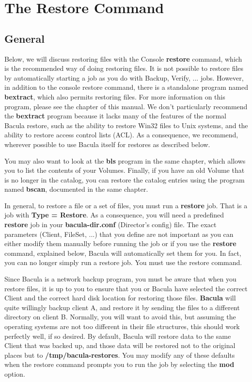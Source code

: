 \chapter{The Restore Command}
\label{RestoreChapter}

\section{General}

Below, we will discuss restoring files with the Console {\bf restore} command,
which is the recommended way of doing restoring files. It is not possible
to restore files by automatically starting a job as you do with Backup,
Verify, ... jobs.  However, in addition to the console restore command,
there is a standalone program named {\bf bextract}, which also permits
restoring files.  For more information on this program, please see the
 chapter of this manual. We 
don't particularly recommend the {\bf bextract} program because it
lacks many of the features of the normal Bacula restore, such as the 
ability to restore Win32 files to Unix systems, and the ability to
restore access control lists (ACL).  As a consequence, we recommend,
wherever possible to use Bacula itself for restores as described below.

You may also want to look at the {\bf bls} program in the same chapter,
which allows you to list the contents of your Volumes.  Finally, if you
have an old Volume that is no longer in the catalog, you can restore the
catalog entries using the program named {\bf bscan}, documented in the same
 chapter.

In general, to restore a file or a set of files, you must run a {\bf restore}
job. That is a job with {\bf Type = Restore}. As a consequence, you will need
a predefined {\bf restore} job in your {\bf bacula-dir.conf} (Director's
config) file. The exact parameters (Client, FileSet, ...) that you define are
not important as you can either modify them manually before running the job or
if you use the {\bf restore} command, explained below, Bacula will  
automatically set them for you. In fact, you can no longer simply run a restore
job.  You must use the restore command.                                  

Since Bacula is a network backup program, you must be aware that when you
restore files, it is up to you to ensure that you or Bacula have selected the
correct Client and the correct hard disk location for restoring those files.
{\bf Bacula} will quite willingly backup client A, and restore it by sending
the files to a different directory on client B. Normally, you will want to
avoid this, but assuming the operating systems are not too different in their
file structures, this should work perfectly well, if so desired. 
By default, Bacula will restore data to the same Client that was backed
up, and those data will be restored not to the original places but to
{\bf /tmp/bacula-restores}.  You may modify any of these defaults when the
restore command prompts you to run the job by selecting the {\bf mod}
option.

